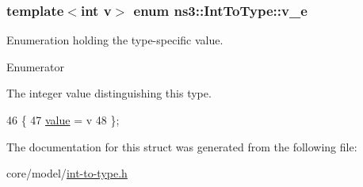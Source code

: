 \subsubsection[{\texorpdfstring{v\+\_\+e}{v_e}}]{\setlength{\rightskip}{0pt plus 5cm}template$<$int v$>$ enum {\bf ns3\+::\+Int\+To\+Type\+::v\+\_\+e}}\hypertarget{structns3_1_1IntToType_ab6365e0b66da4eda3da3d0bac1a0b51b}{}\label{structns3_1_1IntToType_ab6365e0b66da4eda3da3d0bac1a0b51b}
Enumeration holding the type-\/specific value. \begin{Desc}
\item[Enumerator]\par
\begin{description}
\item[{\em 
value\hypertarget{structns3_1_1IntToType_ab6365e0b66da4eda3da3d0bac1a0b51ba0899a36a600d7537c6671f18c45627c4}{}\label{structns3_1_1IntToType_ab6365e0b66da4eda3da3d0bac1a0b51ba0899a36a600d7537c6671f18c45627c4}
}]The integer value distinguishing this type. \end{description}
\end{Desc}

\begin{DoxyCode}
46            \{
47     \hyperlink{structns3_1_1IntToType_ab6365e0b66da4eda3da3d0bac1a0b51ba0899a36a600d7537c6671f18c45627c4}{value} = v  
48   \};
\end{DoxyCode}


The documentation for this struct was generated from the following file\+:\begin{DoxyCompactItemize}
\item 
core/model/\hyperlink{int-to-type_8h}{int-\/to-\/type.\+h}\end{DoxyCompactItemize}
